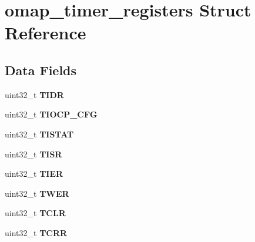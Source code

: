 \hypertarget{structomap__timer__registers}{}\section{omap\+\_\+timer\+\_\+registers Struct Reference}
\label{structomap__timer__registers}
\subsection*{Data Fields}
\begin{DoxyCompactItemize}
\item 
\mbox{\label{structomap__timer__registers_ab38f97efed9820056dee369b9e2ab363}} 
uint32\+\_\+t {\bfseries T\+I\+DR}
\item 
\mbox{\label{structomap__timer__registers_aafe61ae64bfdbce06e0c19f340469d19}} 
uint32\+\_\+t {\bfseries T\+I\+O\+C\+P\+\_\+\+C\+FG}
\item 
\mbox{\label{structomap__timer__registers_a6ed9380968b687f3985444120436eb88}} 
uint32\+\_\+t {\bfseries T\+I\+S\+T\+AT}
\item 
\mbox{\label{structomap__timer__registers_a570b2498fa99bd334eb9c6ac10b31c17}} 
uint32\+\_\+t {\bfseries T\+I\+SR}
\item 
\mbox{\label{structomap__timer__registers_a2a81c6872895711733fad5d8d5417191}} 
uint32\+\_\+t {\bfseries T\+I\+ER}
\item 
\mbox{\label{structomap__timer__registers_afdd50067f5a2c8c2e2bfd4bafa18caa0}} 
uint32\+\_\+t {\bfseries T\+W\+ER}
\item 
\mbox{\label{structomap__timer__registers_ab672e0c261c1a31f72220e5a8fdcc78b}} 
uint32\+\_\+t {\bfseries T\+C\+LR}
\item 
\mbox{\label{structomap__timer__registers_aaeb6ee2afba6d6e51e5c1173d9c28c25}} 
uint32\+\_\+t {\bfseries T\+C\+RR}
\item 
\mbox{\label{structomap__timer__registers_ae4109e5a1ebe33b917bfacccd8cf87d6}} 

\end{DoxyCompactItemize}
